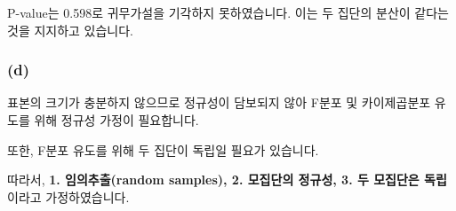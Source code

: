 \documentclass[
  a4paper,
  DIV=11,
  numbers=noendperiod]{scrreprt}
\begin{document}
P-value는 0.598로 귀무가설을 기각하지 못하였습니다. 이는 두 집단의
분산이 같다는 것을 지지하고 있습니다.

\subsubsection*{(d)}\label{d-1}

표본의 크기가 충분하지 않으므로 정규성이 담보되지 않아 F분포 및
카이제곱분포 유도를 위해 정규성 가정이 필요합니다.

또한, F분포 유도를 위해 두 집단이 독립일 필요가 있습니다.

따라서, \textbf{1. 임의추출(random samples), 2. 모집단의 정규성, 3. 두
모집단은 독립}이라고 가정하였습니다.
\end{document}
